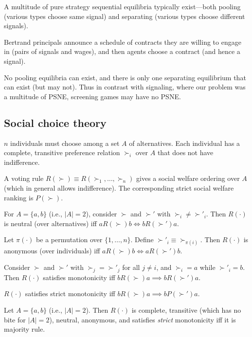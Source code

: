 \documentclass[8pt,letterpaper, landscape]{extarticle} %
\begin{document}
\begin{multicols}{3}
\begin{description}
A multitude of pure strategy sequential equilibria typically exist---both pooling (various types choose same signal) and separating (various types choose different signals).

 Bertrand principals announce a schedule of contracts they are willing to engage in (pairs of signals and wages), and then agents choose a contract (and hence a signal).

No pooling equilibria can exist, and there is only one separating equilibrium that can exist (but may not). Thus in contrast with signaling, where our problem was a multitude of PSNE, screening games may have no PSNE.

\subsection{Social choice theory}
 $ n $ individuals must choose among a set $ A $ of alternatives. Each individual has a complete, transitive preference relation $ \succ_i $ over $ A $ that does not have indifference.

A voting rule $ R (\succ) \equiv R (\succ_1, \dotsc , \succ_n) $ gives a social welfare ordering over $ A $ (which in general allows indifference). The corresponding strict social welfare ranking is $ P (\succ) $.

 For $ A = \{ a , b \} $ (i.e., $ |A| = 2 $), consider $ \succ $ and $ \succ' $ with $ \succ_i \neq \succ'_i $. Then $ R(\cdot) $ is neutral (over alternatives) iff $ a R(\succ) b \iff b R (\succ') a $.

 Let $ \pi (\cdot) $ be a permutation over $ \{ 1 , \dotsc , n \} $. Define $ \succ'_i \equiv \succ_{\pi(i)}  $. Then $ R(\cdot) $ is anonymous (over individuals) iff $ a R(\succ) b \iff a R (\succ') b $.

 Consider $ \succ $ and $ \succ' $ with $ \succ_j = \succ'_j $ for all $ j \neq i $, and $ \succ_i = a $ while $ \succ'_i = b $. Then $ R(\cdot) $ satisfies monotonicity iff $ b R(\succ) a \implies b R(\succ') a $.

$ R(\cdot) $ satisfies strict monotonicity iff $ b R(\succ) a \implies b P(\succ') a $.

 Let $ A = \{ a , b \} $ (i.e., $ |A| = 2 $). Then $ R(\cdot) $ is complete, transitive (which has no bite for $ |A| = 2 $), neutral, anonymous, and satisfies \textit{strict} monotonicity iff it is majority rule.


\end{description}
\end{multicols}
\end{document}

